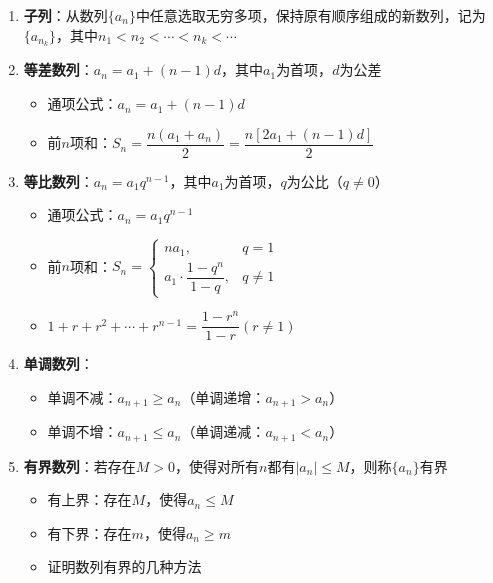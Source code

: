 \documentclass[a4paper,12pt]{article}
\begin{document}
    \begin{enumerate}
        \item \textbf{子列}：从数列$\{a_n\}$中任意选取无穷多项，保持原有顺序组成的新数列，记为$\{a_{n_k}\}$，其中$n_1 < n_2 < \cdots < n_k < \cdots$

        \item \textbf{等差数列}：$a_n = a_1 + (n-1)d$，其中$a_1$为首项，$d$为公差
        \begin{itemize}
            \item 通项公式：$a_n = a_1 + (n-1)d$
            \item 前$n$项和：$S_n = \dfrac{n(a_1 + a_n)}{2} = \dfrac{n[2a_1 + (n-1)d]}{2}$
        \end{itemize}

        \item \textbf{等比数列}：$a_n = a_1 q^{n-1}$，其中$a_1$为首项，$q$为公比（$q \neq 0$）
        \begin{itemize}
            \item 通项公式：$a_n = a_1 q^{n-1}$
            \item 前$n$项和：$S_n = \begin{cases}
                                       na_1, & q = 1 \\ a_1 \cdot \dfrac{1-q^n}{1-q}, & q \neq 1
            \end{cases}$
            \item $1 + r + r^2 + \cdots + r^{n-1} = \dfrac{1-r^n}{1-r}(r \neq 1)$
        \end{itemize}

        \item \textbf{单调数列}：
        \begin{itemize}
            \item 单调不减：$a_{n+1} \ge a_n$（单调递增：$a_{n+1} > a_n$）
            \item 单调不增：$a_{n+1} \le a_n$（单调递减：$a_{n+1} < a_n$）
        \end{itemize}

        \item \textbf{有界数列}：若存在$M > 0$，使得对所有$n$都有$|a_n| \le M$，则称$\{a_n\}$有界
        \begin{itemize}
            \item 有上界：存在$M$，使得$a_n \le M$
            \item 有下界：存在$m$，使得$a_n \ge m$
            \item 证明数列有界的几种方法
        \end{itemize}


\end{enumerate}
\end{document}
